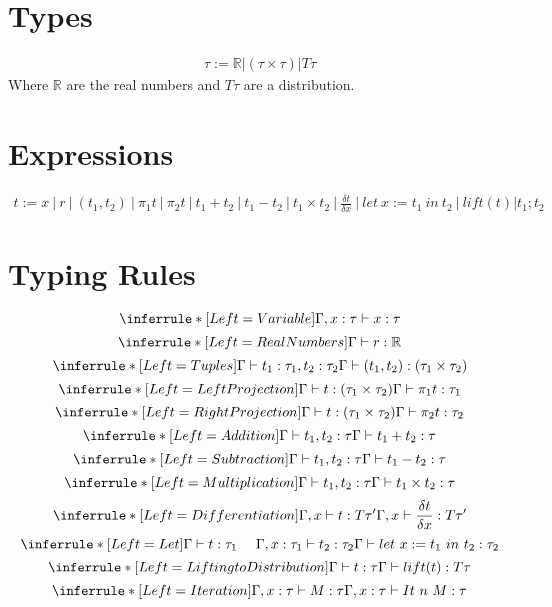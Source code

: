 \documentclass{article}
\begin{document}
    \section{Types}
    \begin{align*}
        \tau := \mathbb{R}|(\tau \times \tau)|T\tau
    \end{align*}
    Where $\mathbb{R}$ are the real numbers and $T\tau$ are a distribution. 
    \section{Expressions}
        \begin{align*}
            t := x\ |\ r\ |\ (t_1, t_2)\ |\ \pi_1 t\ |\ \pi_2 t\ |\ t_1 + t_2\ |\ t_1 - t_2\ |\ t_1 \times t_2\ |\ \frac{\delta t}{\delta x}\ |\ let\ x:= t_1\ in\ t_2\ |\ lift(t)|t_1;t_2
        \end{align*}
    \section{Typing Rules}
        \begin{center}
            $$\inferrule*[Left=Variable]{ }{\Gamma, x:\tau \vdash x:\tau}$$
            $$\inferrule*[Left=Real Numbers]{ }{\Gamma \vdash r:\mathbb{R}}$$
            $$\inferrule*[Left=Tuples]{\Gamma \vdash t_1:\tau_1, t_2:\tau_2}{\Gamma \vdash (t_1, t_2):(\tau_1 \times \tau_2)}$$
            $$\inferrule*[Left=Left Projection]{\Gamma \vdash t:(\tau_1 \times \tau_2)}{\Gamma \vdash \pi_1t:\tau_1}$$
            $$\inferrule*[Left=Right Projection]{\Gamma \vdash t:(\tau_1 \times \tau_2)}{\Gamma \vdash \pi_2t:\tau_2}$$
            $$\inferrule*[Left=Addition]{\Gamma \vdash t_1, t_2:\tau}{\Gamma \vdash t_1 + t_2:\tau}$$
            $$\inferrule*[Left=Subtraction]{\Gamma \vdash t_1, t_2:\tau}{\Gamma \vdash t_1 - t_2:\tau}$$
            $$\inferrule*[Left=Multiplication]{\Gamma \vdash t_1, t_2:\tau}{\Gamma \vdash t_1 \times t_2:\tau}$$
            $$\inferrule*[Left=Differentiation]{\Gamma, x \vdash t:T\tau '}{\Gamma, x \vdash \frac{\delta t}{\delta x}:T\tau'}$$
            $$\inferrule*[Left=Let]{\Gamma \vdash t:\tau_1\ \ \ \ \Gamma, x:\tau_1 \vdash t_2:\tau_2}{\Gamma \vdash let\ x := t_1\ in\ t_2:\tau_2}$$
            $$\inferrule*[Left=Lifting to Distribution]{\Gamma \vdash t:\tau}{\Gamma \vdash lift(t):T\tau}$$
            $$\inferrule*[Left=Iteration]{\Gamma, x:\tau \vdash M:\tau}{\Gamma, x:\tau \vdash It\ n\ M:\tau}$$
        \end{center}
\end{document}

